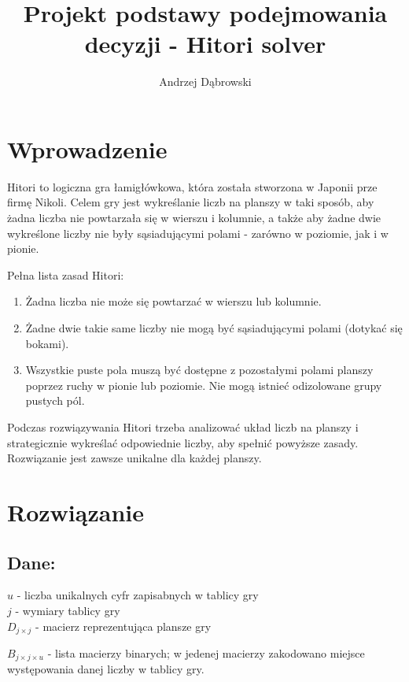 \documentclass{article}
\title{Projekt podstawy podejmowania decyzji - Hitori solver}
\author{Andrzej Dąbrowski}
\begin{document}
\maketitle

\section{Wprowadzenie}

Hitori to logiczna gra łamigłówkowa, która została stworzona w Japonii prze firmę Nikoli. Celem gry jest wykreślanie liczb na planszy w taki sposób, aby żadna liczba nie powtarzała się w wierszu i kolumnie, a także aby żadne dwie wykreślone liczby nie były sąsiadującymi polami - zarówno w poziomie, jak i w pionie.

Pełna lista zasad Hitori:
\begin{enumerate}
    \item Żadna liczba nie może się powtarzać w wierszu lub kolumnie.
    \item Żadne dwie takie same liczby nie mogą być sąsiadującymi polami (dotykać się bokami).
    \item Wszystkie puste pola muszą być dostępne z pozostałymi polami planszy poprzez ruchy w pionie lub poziomie. Nie mogą istnieć odizolowane grupy pustych pól.
\end{enumerate}

Podczas rozwiązywania Hitori trzeba analizować układ liczb na planszy i strategicznie wykreślać odpowiednie liczby, aby spełnić powyższe zasady. Rozwiązanie jest zawsze unikalne dla każdej planszy.

\section{Rozwiązanie}
\subsection{Dane:}

$ u $ - liczba unikalnych cyfr zapisabnych w tablicy gry \\
$ j $ - wymiary tablicy gry \\

$ D_{j\times j} $ - macierz reprezentująca plansze gry

$ B_{j\times j \times u} $ 
- lista macierzy binarych; w jedenej macierzy zakodowano miejsce występowania danej liczby w tablicy gry.
\end{document}
